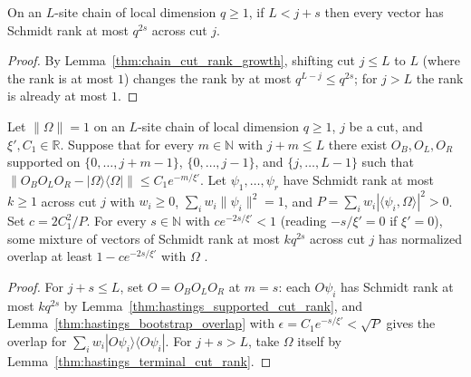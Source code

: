\begin{lemma}
    \label{thm:hastings_terminal_cut_rank}
    \leanok
    On an $L$-site chain of local dimension $q\ge1$, if $L<j+s$ then every
    vector has Schmidt rank at most $q^{2s}$ across cut $j$.
\end{lemma}
\begin{proof}\leanok
    By Lemma~\ref{thm:chain_cut_rank_growth}, shifting cut $j\le L$ to $L$
    (where the rank is at most $1$) changes the rank by at most
    $q^{L-j}\le q^{2s}$; for $j>L$ the rank is already at most $1$.
\end{proof}

\begin{lemma}
    \label{thm:hastings_bootstrap_scale}
    \leanok
    Let $\|\Omega\|=1$ on an $L$-site chain of local dimension $q\ge1$, $j$ be a
    cut, and $\xi',C_1\in\mathbb R$. Suppose that for every $m\in\mathbb N$ with
    $j+m\le L$ there exist $O_B,O_L,O_R$ supported on $\{0,\dots,j+m-1\}$,
    $\{0,\dots,j-1\}$, and $\{j,\dots,L-1\}$ such that
    $\|O_BO_LO_R-|\Omega\rangle\langle\Omega|\|\le C_1e^{-m/\xi'}$. Let
    $\psi_1,\dots,\psi_r$ have Schmidt rank at most $k\ge1$ across cut $j$ with
    $w_i\ge0$, $\sum_iw_i\|\psi_i\|^2=1$, and
    $P=\sum_iw_i|\langle\psi_i,\Omega\rangle|^2>0$. Set $c=2C_1^2/P$. For every
    $s\in\mathbb N$ with $ce^{-2s/\xi'}<1$ (reading $-s/\xi'=0$ if $\xi'=0$),
    some mixture of vectors of Schmidt rank at most $kq^{2s}$ across cut $j$ has
    normalized overlap at least $1-ce^{-2s/\xi'}$ with $\Omega$
    \cite[Lemma~2, eq.~(hg), lines 315--331]{Hastings2007AreaLaw}.
\end{lemma}
\begin{proof}\leanok
    For $j+s\le L$, set $O=O_BO_LO_R$ at $m=s$: each $O\psi_i$ has Schmidt rank
    at most $kq^{2s}$ by Lemma~\ref{thm:hastings_supported_cut_rank}, and
    Lemma~\ref{thm:hastings_bootstrap_overlap} with
    $\epsilon=C_1e^{-s/\xi'}<\sqrt P$ gives the overlap for
    $\sum_iw_i|O\psi_i\rangle\langle O\psi_i|$. For $j+s>L$, take $\Omega$
    itself by Lemma~\ref{thm:hastings_terminal_cut_rank}.
\end{proof}

